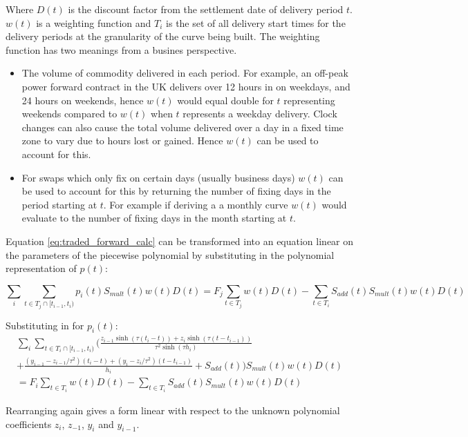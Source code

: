 \documentclass{article}
\begin{document}
Where $D(t)$ is the discount factor from the settlement date of delivery period $t$.
$w(t)$ is a weighting function and $T_i$ is the set of all delivery start times
for the delivery periods at the granularity of the curve being built. The weighting function has two
meanings from a busines perspective.
\begin{itemize}
    \item The volume of commodity delivered in each period. For example, an off-peak power forward 
    contract in the UK delivers over 12 hours in on weekdays, and 24 hours on weekends, hence $w(t)$ 
    would equal double for $t$ representing weekends compared to $w(t)$ when $t$ represents a weekday delivery. 
    Clock changes can also cause the total volume delivered over a day in a fixed time zone to vary 
    due to hours lost or gained. Hence $w(t)$ can be used to account for this.
    \item For swaps which only fix on certain days (usually business days) $w(t)$ can be used to account 
    for this by returning the number of fixing days in the period starting at $t$.
    For example if deriving a a monthly curve $w(t)$ would evaluate to the number of fixing days in the 
    month starting at $t$.
\end{itemize}
Equation \ref{eq:traded_forward_calc} can be transformed into an equation linear on the parameters of the piecewise polynomial by substituting
in the polynomial representation of $p(t)$:

\begin{equation}
    \sum_i \sum_{t \in T_j \cap  [t_{i-1}, t_i) } p_i(t) S_{mult}(t)w(t)D(t) = 
    F_j \sum_{t \in T_j} w(t) D(t) - \sum_{t \in T_i} S_{add}(t) S_{mult}(t)w(t)D(t)
\end{equation}



Substituting in for $p_i(t)$:
\begin{multline}
    \sum_i \sum_{t \in T_i \cap  [t_{i-1}, t_i)} \biggl( \frac{z_{i-1} \sinh(\tau (t_i - t)) + z_i \sinh(\tau (t - t_{i-1}))}{\tau^2 \sinh(\tau h_i)}  \\
    + \frac{(y_{i-1} - z_{i-1}/\tau^2)(t_i - t) + (y_i - z_i/\tau^2)(t - t_{i-1})}{h_i} + 
    S_{add}(t) \biggr) S_{mult}(t)w(t)D(t) \\
    = F_i \sum_{t \in T_i} w(t)D(t) - \sum_{t \in T_i} S_{add}(t) S_{mult}(t)w(t)D(t)
\end{multline}


Rearranging again gives a form linear with respect to the unknown polynomial coefficients
$z_i$, $z_{-1}$, $y_i$ and $y_{i-1}$.
\end{document}

